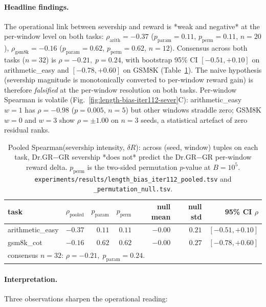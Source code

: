 \paragraph{Headline findings.}
The operational link between severship and reward is *weak and
negative* at the per-window level on both tasks:
$\rho_{\mathrm{arith}}=-0.37$ ($p_{\mathrm{param}}{=}0.11$,
$p_{\mathrm{perm}}{=}0.11$, $n{=}20$),
$\rho_{\mathrm{gsm8k}}=-0.16$ ($p_{\mathrm{param}}{=}0.62$,
$p_{\mathrm{perm}}{=}0.62$, $n{=}12$).  Consensus across both tasks
($n{=}32$) is $\rho=-0.21,\;p=0.24$, with bootstrap 95\% CI
$[-0.51,+0.10]$ on arithmetic\_easy and $[-0.78,+0.60]$ on GSM8K
(Table~\ref{tab:length-bias-iter112-pooled}).  The naive hypothesis
(severship magnitude is monotonically converted to per-window reward
gain) is therefore \emph{falsified} at the per-window resolution on
both tasks.  Per-window Spearman is volatile
(Fig.~\ref{fig:length-bias-iter112-sever}C): arithmetic\_easy
$w{=}1$ has $\rho=-0.98$ ($p{=}0.005$, $n{=}5$) but other windows
straddle zero; GSM8K $w{=}0$ and $w{=}3$ show $\rho=\pm 1.00$ on
$n{=}3$ seeds, a statistical artefact of zero residual ranks.

\begin{table}[t]
\centering
\small
\setlength{\tabcolsep}{5pt}
\begin{tabular}{l r r r r r r}
\hline
task & $\rho_{\mathrm{pooled}}$ & $p_{\mathrm{param}}$ &
$p_{\mathrm{perm}}$ & null mean & null std & 95\% CI $\rho$ \\
\hline
arithmetic\_easy & $-0.37$ & $0.11$ & $0.11$ & $-0.00$ & $0.21$ &
$[-0.51,+0.10]$ \\
gsm8k\_cot       & $-0.16$ & $0.62$ & $0.62$ & $-0.00$ & $0.27$ &
$[-0.78,+0.60]$ \\
\hline
\multicolumn{7}{l}{consensus $n{=}32$: $\rho=-0.21,\;p_{\mathrm{param}}{=}0.24$.}
\end{tabular}
\caption{Pooled Spearman(severship intensity, $\delta R$):
across (seed, window) tuples on each task, Dr.GR$-$GR severship
*does not* predict the Dr.GR$-$GR per-window reward delta.
$p_{\mathrm{perm}}$ is the two-sided permutation $p$-value at
$B{=}10^{5}$.  \texttt{experiments/results/length\_bias\_iter112\_pooled.tsv}
and \texttt{\_permutation\_null.tsv}.}
\label{tab:length-bias-iter112-pooled}
\end{table}

\paragraph{Interpretation.}
Three observations sharpen the operational reading:


